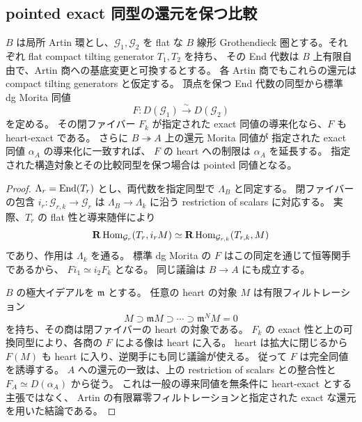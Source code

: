 \subsection{pointed exact 同型の還元を保つ比較}

\begin{lemma}
\label{lem:artin-two-heart-comparison}
$B$ は局所 Artin 環とし、$\mathcal G_1,\mathcal G_2$ を flat な $B$ 線形
Grothendieck 圏とする。それぞれ flat compact tilting generator $T_1,T_2$ を持ち、
その End 代数は $B$ 上有限自由で、Artin 商への基底変更と可換するとする。
各 Artin 商でもこれらの還元は compact tilting generators と仮定する。
頂点を保つ End 代数の同型から標準 dg Morita 同値
\[
 F:D(\mathcal G_1)\xrightarrow{\sim}D(\mathcal G_2)
\]
を定める。
その閉ファイバー $F_k$ が指定された exact 同値の導来化なら、$F$ も heart-exact である。
さらに $B\twoheadrightarrow A$ 上の還元 Morita 同値が
指定された exact 同値 $\alpha_A$ の導来化に一致すれば、
$F$ の heart への制限は $\alpha_A$ を延長する。
指定された構造対象とその比較同型を保つ場合は pointed 同値となる。
\end{lemma}

\begin{proof}
$\Lambda_r=\operatorname{End}(T_r)$ とし、両代数を指定同型で $\Lambda_B$ と同定する。
閉ファイバーの包含 $i_r:\mathcal G_{r,k}\to\mathcal G_r$ は
$\Lambda_B\to\Lambda_k$ に沿う restriction of scalars に対応する。
実際、$T_r$ の flat 性と導来随伴により
\[
 \mathbf R\operatorname{Hom}_{\mathcal G_r}(T_r,i_rM)
 \simeq\mathbf R\operatorname{Hom}_{\mathcal G_{r,k}}(T_{r,k},M)
\]
であり、作用は $\Lambda_k$ を通る。
標準 dg Morita の $F$ はこの同定を通じて恒等関手であるから、
$Fi_1\simeq i_2F_k$ となる。
同じ議論は $B\to A$ にも成立する。

$B$ の極大イデアルを $\mathfrak m$ とする。
任意の heart の対象 $M$ は有限フィルトレーション
\[
 M\supset\mathfrak mM\supset\cdots\supset\mathfrak m^NM=0
\]
を持ち、その商は閉ファイバーの heart の対象である。
$F_k$ の exact 性と上の可換同型により、各商の $F$ による像は heart に入る。
heart は拡大に閉じるから $F(M)$ も heart に入り、逆関手にも同じ議論が使える。
従って $F$ は完全同値を誘導する。
$A$ への還元の一致は、上の restriction of scalars との整合性と
$F_A\simeq D(\alpha_A)$ から従う。
これは一般の導来同値を無条件に heart-exact とする主張ではなく、
Artin の有限冪零フィルトレーションと指定された exact な還元を用いた結論である。
\end{proof}

